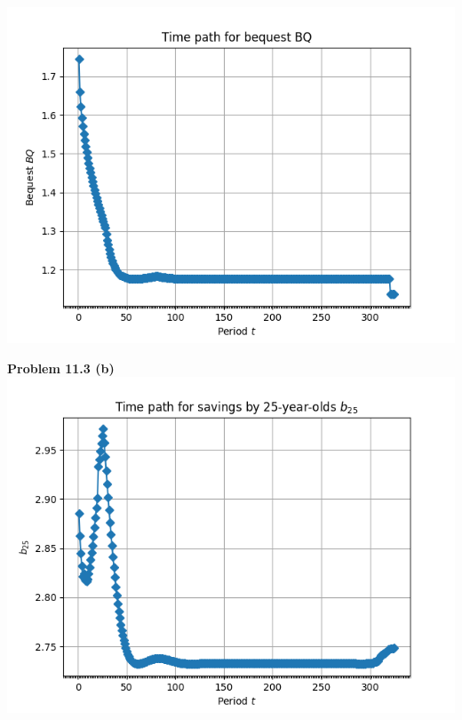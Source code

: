 \documentclass[letterpaper,12pt]{article}
\theoremstyle{definition}
\begin{document}
\includegraphics[scale=0.5]{images/BQpath.png}


\noindent\textbf{Problem 11.3 (b)}\\
\includegraphics[scale=0.5]{images/b25path.png}
\\
\end{document}
